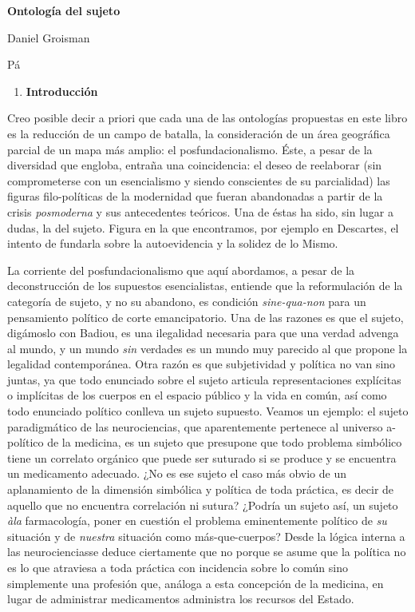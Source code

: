 \textbf{Ontología del sujeto }

Daniel Groisman

Pá

\begin{enumerate}
\def\labelenumi{\arabic{enumi}.}
\item
  \textbf{Introducción }
\end{enumerate}

Creo posible decir a priori que cada una de las ontologías propuestas en este libro es la reducción de un campo de batalla, la consideración de un área geográfica parcial de un mapa más amplio: el posfundacionalismo. Éste, a pesar de la diversidad que engloba, entraña una coincidencia: el deseo de reelaborar (sin comprometerse con un esencialismo y siendo conscientes de su parcialidad) las figuras filo-políticas de la modernidad que fueran abandonadas a partir de la crisis \emph{posmoderna }y sus antecedentes teóricos. Una de éstas ha sido, sin lugar a dudas, la del sujeto. Figura en la que encontramos, por ejemplo en Descartes, el intento de fundarla sobre la autoevidencia y la solidez de lo Mismo.

La corriente del posfundacionalismo que aquí abordamos, a pesar de la deconstrucción de los supuestos esencialistas, entiende que la reformulación de la categoría de sujeto, y no su abandono, es condición \emph{sine-qua-non} para un pensamiento político de corte emancipatorio. Una de las razones es que el sujeto, digámoslo con Badiou, es una ilegalidad necesaria para que una verdad advenga al mundo, y un mundo \emph{sin} verdades es un mundo muy parecido al que propone la legalidad contemporánea. Otra razón es que subjetividad y política no van sino juntas, ya que todo enunciado sobre el sujeto articula representaciones explícitas o implícitas de los cuerpos en el espacio público y la vida en común, así como todo enunciado político conlleva un sujeto supuesto. Veamos un ejemplo: el sujeto paradigmático de las neurociencias, que aparentemente pertenece al universo a-político de la medicina, es un sujeto que presupone que todo problema simbólico tiene un correlato orgánico que puede ser suturado si se produce y se encuentra un medicamento adecuado. ¿No es ese sujeto el caso más obvio de un aplanamiento de la dimensión simbólica y política de toda práctica, es decir de aquello que no encuentra correlación ni sutura? ¿Podría un sujeto así, un sujeto \emph{àla} farmacología, poner en cuestión el problema eminentemente político de \emph{su} situación y de \emph{nuestra} situación como más-que-cuerpos? Desde la lógica interna a las neurocienciasse deduce ciertamente que no porque se asume que la política no es lo que atraviesa a toda práctica con incidencia sobre lo común sino simplemente una profesión que, análoga a esta concepción de la medicina, en lugar de administrar medicamentos administra los recursos del Estado.

